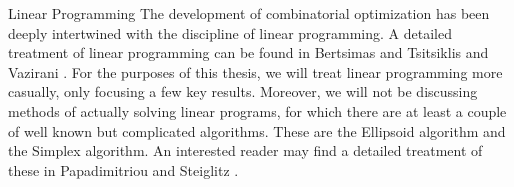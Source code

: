 \begin{section}{Linear Programming}
	The development of combinatorial optimization has been deeply intertwined with the discipline 
	of linear programming. 
	A detailed treatment of linear programming can be found in Bertsimas and Tsitsiklis 
	\cite{bertsimas1997introduction} and Vazirani \cite{vazirani2002approximation}.
	For the purposes of this thesis, we will treat linear programming more casually, only focusing 
	a few key results. Moreover, we will not be discussing methods of actually solving linear 
	programs, for which there are at least a couple of well known but complicated algorithms. These 
	are the Ellipsoid algorithm and the Simplex algorithm. An interested reader may find a detailed 
	treatment of these in Papadimitriou and Steiglitz \cite{papadimitriou2013combinatorial}.


\end{section}
